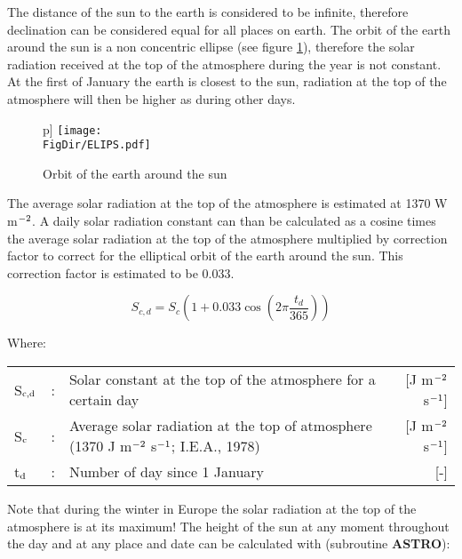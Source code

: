 The distance of the sun to the earth is considered to be infinite, therefore declination 
can be considered equal for all places on earth. The orbit of the earth around the sun is a
non concentric ellipse (see figure \ref{fig:orbit}), therefore the solar radiation received 
at the top of the atmosphere during the year is not constant. At the first of January the 
earth is closest to the sun, radiation at the top of the atmosphere will then be higher as 
during other days.

\begin{figure}p]
	\centering
	\texttt{[image: \\FigDir/ELIPS.pdf]}
	\caption{Orbit of the earth around the sun}
	\label{fig:orbit}
\end{figure}

The average solar radiation at the top of the atmosphere is estimated at 1370 W m$^{\rm -2}$. A daily solar radiation constant can than be calculated as a cosine times the average solar radiation at the top of the atmosphere multiplied by correction factor to correct for the elliptical orbit of the earth around the sun. This correction factor is estimated to be 0.033.

\begin{equation}
\label{eq:SolarConst}
S _{c,d} = S _{c} (1+0.033 \cos (2 \pi {\frac{t _{d} }{365}} ))
\end{equation}

Where:\\[5pt]
\begin{tabularx}{\textwidth}{llXr}
	S$_{{\rm c,d}}$ &:& Solar constant at the top of the atmosphere for a certain day  & [J m$^{{\rm -2}}$ s$^{{\rm -1}}$]\\
	S$_{{\rm c}}$ &:& Average solar radiation at the top of atmosphere (1370 J m$^{{\rm -2}}$ s$^{{\rm -1}}$; I.E.A., 1978) & [J m$^{{\rm -2}}$ s$^{{\rm -1}}$]\\
	t$_{{\rm d}}$ &:& Number of day since 1 January  & [-]\\
\end{tabularx}

Note that during the winter in Europe the solar radiation at the top of the atmo\-sphere is at 
its maximum! The height of the sun at any moment throughout the day and at any place and date can be
calculated with (subroutine {\bf ASTRO}):

